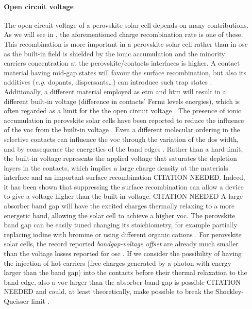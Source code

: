 	\paragraph{Open circuit voltage}
	The open circuit voltage of a perovskite solar cell depends on many contributions.
	As we will see in \cite{ch:characterization}, the aforementioned charge recombination rate is one of these.
	This recombination is more important in a perovskite solar cell rather than in \gls{osc} as the built-in field is shielded by the ionic accumulation and the minority carriers concentration at the perovskite\-/contacts interfaces is higher.
	A contact material having mid-gap states will favour the surface recombination, but also its additives (\textsl{e.g.} dopants, dispersants\dots) can introduce such trap states \cite{Correa-Baena2017}.
	Additionally, a different material employed as \gls{etm} and \gls{htm} will result in a different built-in voltage (difference in contacts' Fermi levels energies), which is often regarded as a limit for the the open circuit voltage \cite{Gelmetti2019,Wu2016}.
	The presence of ionic accumulation in perovskite solar cells have been reported to reduce the influence of the \gls{voc} from the built-in voltage \cite{Belisle2016}.
	Even a different molecular ordering in the selective contacts can influence the \gls{voc} through the variation of the \gls{dos} width, and by consequence the energetics of the band edges \cite{Shao2016}.
	Rather than a hard limit, the built-in voltage represents the applied voltage that saturates the depletion layers in the contacts, which implies a large charge density at the materials interface and an important surface recombination CITATION NEEDED.
	Indeed, it has been shown that suppressing the surface recombination can allow a device to give a voltage higher than the built-in voltage. CITATION NEEDED
	A large absorber band gap will have the excited charges thermally relaxing to a more energetic band, allowing the solar cell to achieve a higher \gls{voc}.
	The perovskite band gap can be easily tuned changing its stoichiometry, for example partially replacing iodine with bromine \cite{McMeekin2016,Noh2013a,Wheeler2017} or using different organic cations \cite{Eperon2014}.
	For perovskite solar cells, the record reported \textit{bandgap\hyp{}voltage offset} are already much smaller than the voltage losses reported for \gls{osc} \cite{Tvingstedt2015}.
	If we consider the possibility of having the injection of hot carriers (free charges generated by a photon with energy larger than the band gap) into the contacts before their thermal relaxation to the band edge, also a \gls{voc} larger than the absorber band gap is possible CITATION NEEDED and could, at least theoretically, make possible to break the Shockley\hyp{}Queisser limit \cite{WikipediaSQlimit}.

